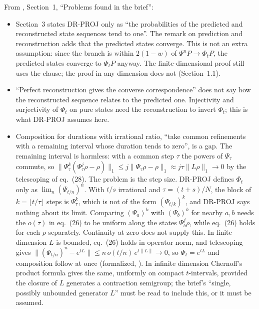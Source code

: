 \documentclass[11pt]{article}
\begin{document}
\noindent
From , Section~1, ``Problems found in the brief'':
\begin{itemize}
\item Section~3 states DR-PROJ only as ``the probabilities of the predicted and reconstructed
  state sequences tend to one''. The remark on prediction and reconstruction adds that the
  predicted states converge. This is not an extra assumption: since the branch is within
  $2(1-w)$ of $\Psi^nP \to \Phi_tP$, the predicted states converge to $\Phi_tP$ anyway. The
  finite-dimensional proof still uses the clause; the proof in any dimension does not
  (Section~1.1).
\item ``Perfect reconstruction gives the converse correspondence'' does not say how the
  reconstructed sequence relates to the predicted one. Injectivity and surjectivity of $\Phi_t$ on
  pure states need the reconstruction to invert $\Phi_t$; this is what DR-PROJ assumes here.
\item Composition for durations with irrational ratio, ``take common refinements with a
  remaining interval whose duration tends to zero'', is a gap. The remaining interval is
  harmless: with a common step $\tau$ the powers of $\Psi_\tau$ commute, so
  $\|\Psi_\tau^k(\Psi_\tau^j\rho - \rho)\|_1 \le j\|\Psi_\tau\rho - \rho\|_1
  \approx j\tau\|L\rho\|_1
  \to 0$ by the telescoping of eq.~(28). The problem is the step size. DR-PROJ defines $\Phi_t$
  only as $\lim_n (\Psi_{t/n})^n$. With $t/s$ irrational and $\tau = (t+s)/N$, the block of
  $k = \lfloor t/\tau\rfloor$ steps is $\Psi_\tau^k$, which is not of the form $(\Psi_{t/k})^k$,
  and DR-PROJ says nothing about its limit. Comparing $(\Psi_a)^k$ with $(\Psi_b)^k$ for nearby
  $a, b$ needs the $o(\tau)$ in eq.~(26) to be uniform along the states $\Psi_b^j\rho$, while
  eq.~(26) holds for each $\rho$ separately. Continuity at zero does not supply this. In finite
  dimension $L$ is bounded, eq.~(26) holds in operator norm, and telescoping gives
  $\|(\Psi_{t/n})^n - e^{tL}\| \le n\,o(t/n)\,e^{t\|L\|} \to 0$, so $\Phi_t = e^{tL}$ and
  composition follow at once (formalized, ). In infinite
  dimension Chernoff's product formula gives the same,
  uniformly on compact $t$-intervals, provided the closure of $L$ generates a contraction
  semigroup; the brief's ``single, possibly unbounded generator $L$'' must be read to include
  this, or it must be assumed.
\end{itemize}
\end{document}
